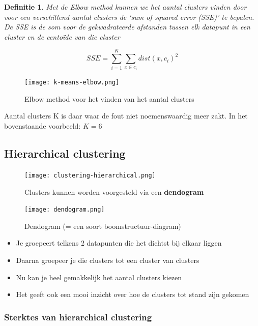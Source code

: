 \documentclass{article}
\newtheorem{theorem}{Definitie}[section]
\begin{document}
\begin{theorem}
    Met de Elbow method kunnen we het aantal clusters vinden door voor een verschillend aantal
    clusters de `sum of squared error (SSE)' te bepalen. De SSE is de som voor de gekwadrateerde
    afstanden tussen elk datapunt in een cluster en de centoïde van die cluster
\end{theorem}

\begin{equation}
    SSE = \sum_{i=1}^K \sum_{x \in c_i} dist(x, c_i)^2
\end{equation}

\begin{figure}[H]
    \centering
    \texttt{[image: k-means-elbow.png]}
    \caption{Elbow method voor het vinden van het aantal clusters}
\end{figure}

Aantal clusters K is daar waar de fout niet noemenswaardig meer zakt. In het bovenstaande voorbeeld: $K=6$

\subsection{Hierarchical clustering}

\begin{figure}[H]
    \centering
    \texttt{[image: clustering-hierarchical.png]}
    \caption{Clusters kunnen worden voorgesteld via een \textbf{dendogram}}
\end{figure}

\begin{figure}[H]
    \centering
    \texttt{[image: dendogram.png]}
    \caption{Dendogram (= een soort boomstructuur-diagram)}
\end{figure}

\begin{itemize}
    \item Je groepeert telkens 2 datapunten die het dichtst bij elkaar liggen
    \item Daarna groepeer je die clusters tot een cluster van clusters
    \item Nu kan je heel gemakkelijk het aantal clusters kiezen
    \item Het geeft ook een mooi inzicht over hoe de clusters tot stand zijn gekomen
\end{itemize}

\subsubsection{Sterktes van hierarchical clustering}
\end{document}
